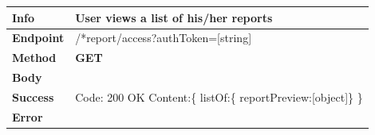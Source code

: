 


\begin{table}[H]
\begin{tabular}{|l|p{}|}
\hline
\textbf{Info}             & User views a list of his/her reports                                                              \\ \hline
\textbf{Endpoint}    &  /*report/access?authToken=[string] \\ \hline
\textbf{Method}         &   \textbf{GET}                                                                            \\ \hline

\textbf{Body}  & 
                    \\ \hline
                    
\textbf{Success} &  Code: 200 OK \newline
                    Content:\{\newline 
                    listOf:\{\newline
                    reportPreview:[object]\newline \}\newline
                    \}\\ \hline
\textbf{Error} &  
                \\\hline

\end{tabular}
\end{table}




